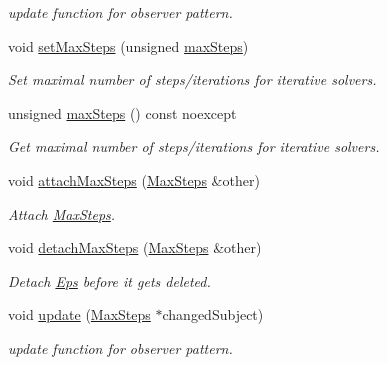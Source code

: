 \begin{DoxyCompactItemize}
\begin{DoxyCompactList}\small\item\em update function for observer pattern. \end{DoxyCompactList}\item 
void \hyperlink{classSpacy_1_1Mixin_1_1MaxSteps_a72f0b7eb50c9a017b5f5e6c2ccf7dfd9_a72f0b7eb50c9a017b5f5e6c2ccf7dfd9}{set\+Max\+Steps} (unsigned \hyperlink{classSpacy_1_1Mixin_1_1MaxSteps_aaeb0b209c78e7b8dd9b268641ce11977_aaeb0b209c78e7b8dd9b268641ce11977}{max\+Steps})
\begin{DoxyCompactList}\small\item\em Set maximal number of steps/iterations for iterative solvers. \end{DoxyCompactList}\item 
unsigned \hyperlink{classSpacy_1_1Mixin_1_1MaxSteps_aaeb0b209c78e7b8dd9b268641ce11977_aaeb0b209c78e7b8dd9b268641ce11977}{max\+Steps} () const noexcept
\begin{DoxyCompactList}\small\item\em Get maximal number of steps/iterations for iterative solvers. \end{DoxyCompactList}\item 
void \hyperlink{classSpacy_1_1Mixin_1_1MaxSteps_a8b093369a1ce5a6323f3dc3c41a738e6_a8b093369a1ce5a6323f3dc3c41a738e6}{attach\+Max\+Steps} (\hyperlink{classSpacy_1_1Mixin_1_1MaxSteps_a8e5d8290884bdc760147862d5b9644dc_a8e5d8290884bdc760147862d5b9644dc}{Max\+Steps} \&other)
\begin{DoxyCompactList}\small\item\em Attach \hyperlink{classSpacy_1_1Mixin_1_1MaxSteps}{Max\+Steps}. \end{DoxyCompactList}\item 
\hypertarget{classSpacy_1_1Mixin_1_1MaxSteps_ac16eca4cd967aed1856f072b08f4aabd}{}void \hyperlink{classSpacy_1_1Mixin_1_1MaxSteps_ac16eca4cd967aed1856f072b08f4aabd}{detach\+Max\+Steps} (\hyperlink{classSpacy_1_1Mixin_1_1MaxSteps_a8e5d8290884bdc760147862d5b9644dc_a8e5d8290884bdc760147862d5b9644dc}{Max\+Steps} \&other)\label{classSpacy_1_1Mixin_1_1MaxSteps_ac16eca4cd967aed1856f072b08f4aabd}

\begin{DoxyCompactList}\small\item\em Detach \hyperlink{classSpacy_1_1Mixin_1_1Eps}{Eps} before it gets deleted. \end{DoxyCompactList}\item 
\hypertarget{classSpacy_1_1Mixin_1_1MaxSteps_a8e0f4d29b15dff17d4503788a9e2e081}{}void \hyperlink{classSpacy_1_1Mixin_1_1MaxSteps_a8e0f4d29b15dff17d4503788a9e2e081}{update} (\hyperlink{classSpacy_1_1Mixin_1_1MaxSteps_a8e5d8290884bdc760147862d5b9644dc_a8e5d8290884bdc760147862d5b9644dc}{Max\+Steps} $\ast$changed\+Subject)\label{classSpacy_1_1Mixin_1_1MaxSteps_a8e0f4d29b15dff17d4503788a9e2e081}

\begin{DoxyCompactList}\small\item\em update function for observer pattern. \end{DoxyCompactList}\end{DoxyCompactItemize}
